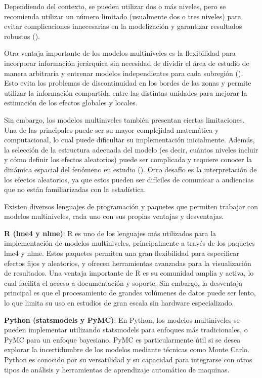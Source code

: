 \documentclass[
  manuscript=article,  
  layout=preprint,  
]{format}
\begin{document}
Dependiendo del contexto, se pueden utilizar dos o más niveles, pero se recomienda utilizar un número limitado (usualmente dos o tres niveles) para evitar complicaciones innecesarias en la modelización y garantizar resultados robustos (\cite{lee1996hierarchical, kumar2011hierarchical}).

Otra ventaja importante de los modelos multiniveles es la flexibilidad para incorporar información jerárquica sin necesidad de dividir el área de estudio de manera arbitraria y entrenar modelos independientes para cada subregión (\cite{lee1996hierarchical}). Esto evita los problemas de discontinuidad en los bordes de las zonas y permite utilizar la información compartida entre las distintas unidades para mejorar la estimación de los efectos globales y locales.

Sin embargo, los modelos multiniveles también presentan ciertas limitaciones. Una de las principales puede ser su mayor complejidad matemática y computacional, lo cual puede dificultar su implementación inicialmente. Además, la selección de la estructura adecuada del modelo (es decir, cuántos niveles incluir y cómo definir los efectos aleatorios) puede ser complicada y requiere conocer la dinámica espacial del fenómeno en estudio (\cite{kumar2011hierarchical}). Otro desafío es la interpretación de los efectos aleatorios, ya que estos pueden ser difíciles de comunicar a audiencias que no están familiarizadas con la estadística.

Existen diversos lenguajes de programación y paquetes que permiten trabajar con modelos multiniveles, cada uno con sus propias ventajas y desventajas. 

\textbf{R (lme4 y nlme)}: R es uno de los lenguajes más utilizados para la implementación de modelos multiniveles, principalmente a través de los paquetes lme4 y nlme. Estos paquetes permiten una gran flexibilidad para especificar efectos fijos y aleatorios, y ofrecen herramientas avanzadas para la visualización de resultados. Una ventaja importante de R es su comunidad amplia y activa, lo cual facilita el acceso a documentación y soporte. Sin embargo, la desventaja principal es que el procesamiento de grandes volúmenes de datos puede ser lento, lo que limita su uso en estudios de gran escala sin hardware especializado.

\textbf{Python (statsmodels y PyMC)}: En Python, los modelos multiniveles se pueden implementar utilizando statsmodels para enfoques más tradicionales, o PyMC para un enfoque bayesiano. PyMC es particularmente útil si se desea explorar la incertidumbre de los modelos mediante técnicas como Monte Carlo. Python es conocido por su versatilidad y su capacidad para integrarse con otros tipos de análisis y herramientas de aprendizaje automático de maquinas.
\end{document}
